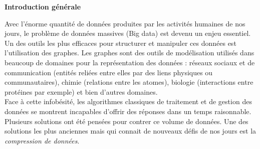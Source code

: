 \documentclass[a4paper,oneside,12pt]{report}
\theoremstyle{definition}
\begin{document}





 

\pagestyle{plain}
\tableofcontents
\newpage



\listoffigures
{}
\cleardoublepage


\listoftables
{}



\printglossaries



\cleardoublepage



	\thispagestyle{plain}
		\Huge{ 
			\textbf {Introduction générale}} \\[0.5in]
			\normalsize
			Avec l'énorme quantité de données produites par les activités humaines de nos jours, le problème de données massives (Big data) est devenu un enjeu essentiel. Un des outils les plus efficaces pour structurer et manipuler ces données est l'utilisation des graphes. Les graphes sont des outils de modélisation utilisés dans beaucoup de domaines pour la représentation des données : réseaux sociaux et de communication (entités reliées entre elles par des liens physiques ou communautaires), chimie (relations entre les atomes), biologie (interactions entre protéines par exemple) et bien d'autres domaines.\\
			
	Face à cette infobésité, les algorithmes classiques de traitement et de gestion des données se montrent incapables d'offrir des réponses dans un temps raisonnable. Plusieurs solutions ont été pensées pour contrer ce volume de données. Une des solutions les plus anciennes mais qui connait de nouveaux défis de nos jours est la \textit{ compression de données}.\\
\end{document}
